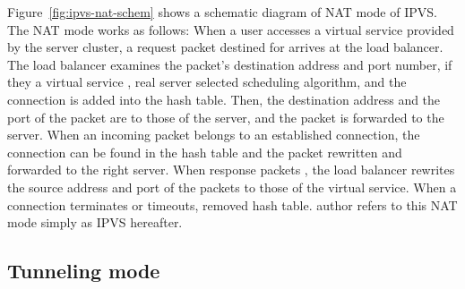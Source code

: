 Figure~\ref{fig:ipvs-nat-schem} shows a schematic diagram of NAT mode of IPVS.
The NAT mode works as follows: When a user accesses a virtual service provided by the server cluster, a request packet destined for  arrives at the load balancer.
The load balancer examines the packet's destination address and port number, if they  a virtual service ,  real server selected  scheduling algorithm, and  the connection is added into the  hash table. 
Then, the destination  address and the port  of the  packet are  to those of the  server, and the packet is forwarded to the  server. 
When an incoming packet belongs to an established connection, the connection can be found in the hash table and the packet  rewritten and forwarded to the right server. 
When response packets , the load balancer rewrites the source address and port  of the packets to those of the virtual service.
When a connection terminates or timeouts,  removed  hash table.
%
 author refers to this NAT mode simply as IPVS hereafter.

\FloatBarrier

\subsection{Tunneling mode}

